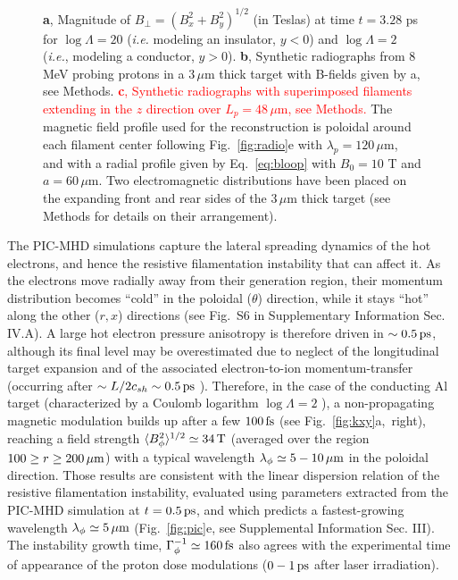 \documentclass[aps,twocolumn,showpacs,superscriptaddress]{revtex4}
\begin{document}
\begin{figure}
{\textbf{a}, Magnitude of $B_\perp=(B_x^2+B_y^2)^{1/2}$ (in Teslas) at time $t=3.28$ ps for $\log \Lambda=20$ (\emph{i.e.} modeling an insulator, $y<0$) and $\log\Lambda=2$ (\emph{i.e.}, modeling a conductor, $y>0$).
\textbf{b}, Synthetic radiographs from $8$ MeV probing protons in a 
$3\, \mu$m thick target with B-fields given by a, see Methods.
\textcolor{red}{
\textbf{c}, Synthetic radiographs with superimposed filaments extending in the $z$ direction over $L_p = 48\,\mu$m, see Methods.} 
The magnetic field profile used for the reconstruction is poloidal around each filament center following Fig.~\ref{fig:radio}e with $\lambda_p = 120\, \mu$m, and with a radial profile given by Eq.~\eqref{eq:bloop} with $B_0=10$ T and $a = 60\, \mu$m. Two electromagnetic distributions have been placed on the expanding front and rear sides of the $3\,\mu$m thick target (see Methods for details on their arrangement).
}\end{figure}

The PIC-MHD simulations capture the lateral spreading dynamics of the hot electrons, and hence the resistive filamentation instability that can affect it. As the electrons move radially away from their generation region, their momentum distribution becomes ``cold'' in the poloidal ($\theta$) direction, while it stays ``hot'' along the other ($r,x$) directions (see Fig.~S6 in Supplementary Information Sec. IV.A). A large hot electron pressure anisotropy is therefore driven in $\sim 0.5\,\rm ps$, although its final level may be overestimated due to neglect of the longitudinal target expansion and of the associated electron-to-ion momentum-transfer (occurring after $\sim L/2c_{sh} \sim 0.5\,\rm ps$ \cite{PRE_Mora_2005}). Therefore, in the case of the conducting Al target (characterized by a Coulomb logarithm $\log \Lambda = 2$ \cite{POF_Lee_1984}), a non-propagating magnetic modulation builds up after a few $100\,\rm fs$ (see \mbox{Fig.~\ref{fig:kxy}a, right}), reaching a field strength $\langle B_\phi^2\rangle^{1/2}\simeq 34\,\rm T$ (averaged over the region $100 \ge r \ge 200\,\mu \rm m$) with a typical wavelength $\lambda_\phi \simeq 5-10\,\rm \mu m$  in the poloidal direction. Those results are consistent with the linear dispersion relation of the resistive filamentation instability, evaluated using parameters extracted from the PIC-MHD simulation at $t=0.5\,\rm ps$, and which predicts a fastest-growing wavelength $\lambda_\phi \simeq 5\,\mu \rm m$ (Fig.~\ref{fig:pic}e, see Supplemental Information Sec. III). The instability growth time, $\Gamma_\phi^{-1}\simeq 160\,\rm fs$ also agrees with the experimental time of appearance of the proton dose modulations ($0-1\,\rm ps$ after laser irradiation).
\end{document}
